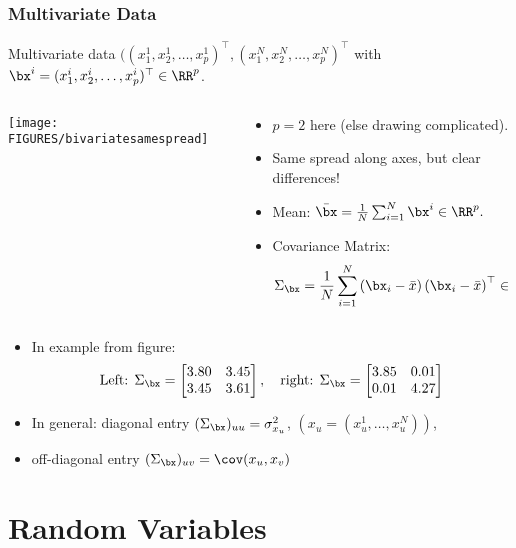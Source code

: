 \documentclass[9pt]{beamer}
\begin{document}
\begin{frame}\frametitle{Multivariate Data}
  Multivariate data $((x_1^1,x_2^1,\dots,x_p^1)^\top ,(x_1^N,x_2^N,\dots,x_p^N)^\top$ with $\bx^i=(x_1^i,x_2^i,\dots,x_p^i)^\top \in \RR^p$.
  \begin{columns}
    \begin{column}{0.5\textwidth}
      \begin{center}
        \texttt{[image: FIGURES/bivariatesamespread]}
      \end{center}
    \end{column}
    \begin{column}{0.5\textwidth}
      \begin{itemize}
      \item $p = 2$ here (else drawing complicated).
      \item Same spread along axes, but clear differences!
      \item Mean:
        $
        \bar{\bx} = \frac1N\sum_{i=1}^N \bx^i\in \RR^p. 
        $
      \item Covariance Matrix:
        $$
        \Sigma_\bx = \frac1N\sum_{i=1}^N\left(\bx_i-\bar{x}\right)\left(\bx_i-\bar{x}\right)^\top\in \RR^{p\times p}
        $$
      \end{itemize}
    \end{column}
  \end{columns}
  \begin{itemize}
  \item  In example from figure:
    $$
    \text{Left: } \Sigma_\bx = \begin{bmatrix}
      3.80  & 3.45\\
      3.45  & 3.61
    \end{bmatrix},\quad
    \text{right: } \Sigma_\bx = \begin{bmatrix}
      3.85  & 0.01\\
      0.01  & 4.27
    \end{bmatrix}
    $$
  \item In general: diagonal entry $(\Sigma_\bx)_{uu} = \sigma^2_{x_u}$, $(x_u = (x_u^1,\dots, x_u^N))$,
  \item off-diagonal entry $(\Sigma_\bx)_{uv} = \cov(x_u,x_v)$ 
  \end{itemize}
\end{frame}





\section{Random Variables}
\end{document}
